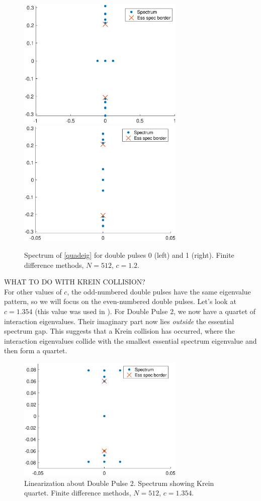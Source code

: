 \documentclass[12pt]{article}
\begin{document}
\begin{figure}[H]
\centering
\includegraphics[width=8cm]{spec12_double1.eps}
\includegraphics[width=8cm]{spec12_double2.eps}
\caption{Spectrum of \eqref{quadeig} for double pulses 0 (left) and 1 (right). Finite difference methods, $N = 512$, $c = 1.2$.}
\label{fig:quadeigdouble}
\end{figure}

WHAT TO DO WITH KREIN COLLISION?\\

For other values of $c$, the odd-numbered double pulses have the same eigenvalue pattern, so we will focus on the even-numbered double pulses. Let's look at $c = 1.354$ (this value was used in \cite{Chen1997}). For Double Pulse 2, we now have a quartet of interaction eigenvalues. Their imaginary part now lies \emph{outside} the essential spectrum gap. This suggests that a Krein collision has occurred, where the interaction eigenvalues collide with the smallest essential spectrum eigenvalue and then form a quartet.

\begin{figure}[H]
\centering
\includegraphics[width=8cm]{spec1354_double2.eps}
\caption{Linearization about Double Pulse 2. Spectrum showing Krein quartet. Finite difference methods, $N = 512$, $c = 1.354$.}
\end{figure}
\end{document}
